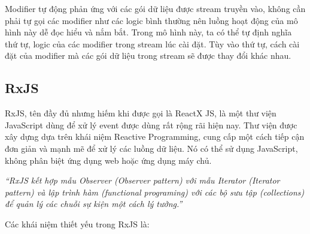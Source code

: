 Modifier tự động phản ứng với các gói dữ liệu được stream truyền vào, không cần phải tự gọi các modifier như các logic bình thường nên luồng hoạt động của mô hình này dễ đọc hiểu và nắm bắt.
Trong mô hình này, ta có thể tự định nghĩa thứ tự, logic của các modifier trong stream lúc cài đặt.
Tùy vào thứ tự, cách cài đặt của modifier mà các gói dữ liệu trong stream sẽ được thay đổi khác nhau.

\subsection{RxJS}

\tab RxJS, tên đầy đủ nhưng hiếm khi được gọi là ReactX JS, là một thư viện JavaScript dùng để xử lý event được dùng rất rộng rãi hiện nay.
Thư viện được xây dựng dựa trên khái niệm Reactive Programming, cung cấp một cách tiếp cận đơn giản và mạnh mẽ để xử lý các luồng dữ liệu.
Nó có thể sử dụng JavaScript, không phân biệt ứng dụng web hoặc ứng dụng máy chủ.
\par

\textit{“RxJS kết hợp mẫu Observer (Observer pattern) với mẫu Iterator (Iterator pattern) và lập trình hàm (functional programing) với các bộ sưu tập (collections) để quản lý các chuỗi sự kiện một cách lý tưởng.”} \cite{chap4bib5}
\par

Các khái niệm thiết yếu trong RxJS là: \cite{chap4bib5}

